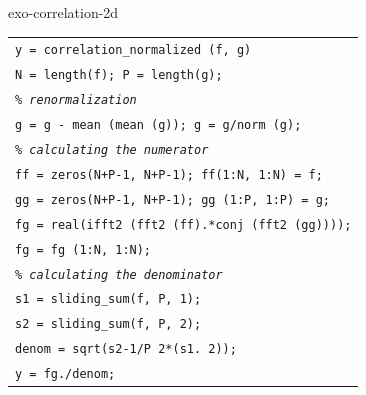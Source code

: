 \begin{correction}{exo-correlation-2d}
\begin{enumerate}
\begin{listing} 
\begin{footnotesize}
{\upshape
\begin{tabular}{l} \texttt{\pfunction y = correlation\_normalized (f, g)} \\
\texttt{N = length(f); P = length(g);} \\
\texttt{\textit{\% renormalization}} \\
\texttt{g = g - mean (mean (g)); g = g/norm (g);} \\
\texttt{\textit{\% calculating the numerator}} \\
\texttt{ff = zeros(N+P-1, N+P-1); ff(1:N, 1:N) = f;} \\
\texttt{gg = zeros(N+P-1, N+P-1); gg (1:P, 1:P) = g;} \\
\texttt{fg = real(ifft2 (fft2 (ff).*conj (fft2 (gg))));} \\
\texttt{fg = fg (1:N, 1:N);} \\
\texttt{\textit{\% calculating the denominator}} \\
\texttt{s1 = sliding\_sum(f, P, 1);} \\
\texttt{s2 = sliding\_sum(f, P, 2);} \\
\texttt{denom = sqrt(s2-1/P \hatverb{} 2*(s1. \hatverb{} 2));} \\
\texttt{y = fg./denom;} \\
\end{tabular}
}
\end{footnotesize}
\caption{Procedure \texttt{\upshape correlation\_normalisee}}
\label{listing-correlation-normalized}
\end{listing}
\end{enumerate}
\end{correction}
 
